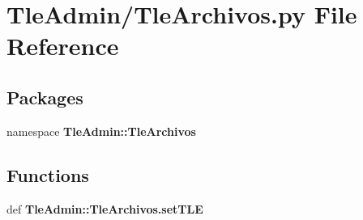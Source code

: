 \section{\-Tle\-Admin/\-Tle\-Archivos.py \-File \-Reference}
\label{_tle_archivos_8py}
\subsection*{\-Packages}
\begin{DoxyCompactItemize}
\item 
namespace {\bf \-Tle\-Admin\-::\-Tle\-Archivos}
\end{DoxyCompactItemize}
\subsection*{\-Functions}
\begin{DoxyCompactItemize}
\item 
def {\bf \-Tle\-Admin\-::\-Tle\-Archivos.\-set\-T\-L\-E}
\end{DoxyCompactItemize}
